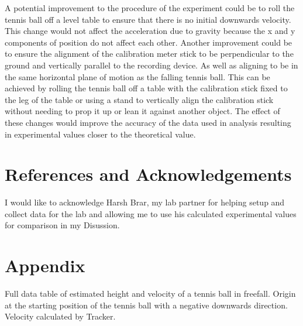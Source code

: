 \documentclass[titlepage]{article}
\begin{document}
A potential improvement to the procedure of the experiment could be to roll the tennis ball off a level table to ensure that there is no initial downwards velocity. This change would not affect the acceleration due to gravity because the x and y components of position do not affect each other.
Another improvement could be to ensure the alignment of the calibration meter stick to be perpendicular to the ground and vertically parallel to the recording device. As well as aligning to be in the same horizontal plane of motion as the falling tennis ball.
This can be achieved by rolling the tennis ball off a table with the calibration stick fixed to the leg of the table or using a stand to vertically align the calibration stick without needing to prop it up or lean it against another object.
The effect of these changes would improve the accuracy of the data used in analysis resulting in experimental values closer to the theoretical value.

\newpage

\section{References and Acknowledgements}

\nocite{*}
\printbibliography

I would like to acknowledge Harsh Brar, my lab partner for helping setup and collect data for the lab and allowing me to use his calculated experimental values for comparison in my Disussion.

\section{Appendix}

\begin{table}[h]
   \caption{Full data table of estimated height and velocity of a tennis ball in freefall. Origin at the starting position of the tennis ball with a negative downwards direction. Velocity calculated by Tracker.}
   \label{tab:complete-data}
   \begin{center}
   \end{center}
\end{table}
\end{document}
